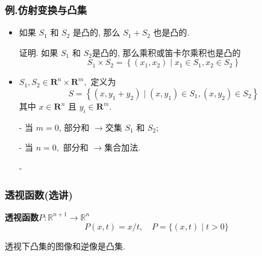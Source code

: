 \documentclass[handout]{beamer}
\begin{document}
\begin{frame}
\frametitle{例.仿射变换与凸集}

\begin{itemize}
	 
\item 
如果 $S_{1}$ 和 $S_{2}$ 是凸的, 那么 $S_{1}+S_{2}$ 也是凸的.


 
\begin{footnotesize}证明. 如果 $S_{1}$ 和 $S_{2}$是凸的, 那么乘积或笛卡尔乘积也是凸的
$$
S_{1} \times S_{2}=\left\{\left(x_{1}, x_{2}\right) \mid x_{1} \in S_{1}, x_{2} \in S_{2}\right\}
$$
\end{footnotesize}

\item  {} $S_{1}, S_{2} \in \mathbf{R}^{n} \times \mathbf{R}^{m},$ 定义为
$$
S=\left\{\left(x, y_{1}+y_{2}\right) \mid\left(x, y_{1}\right) \in S_{1},\left(x, y_{2}\right) \in S_{2}\right\}
$$
其中 $x \in \mathbf{R}^{n}$ 且 $y_{i} \in \mathbf{R}^{m}$.

- 当 $m=0$, 部分和 $\rightarrow$交集 $S_{1}$ 和 $S_{2} ;$

- 当 $n=0,$ 部分和 $\rightarrow$集合加法.

- 
\end{itemize}
\end{frame}

\begin{frame}
	\frametitle{透视函数(选讲)}

	\textbf{透视函数}$P: \mathbb{R}^{n+1} \rightarrow \mathbb{R}^{n}$
    \begin{equation}
	    P(x, t)=x / t, \quad  P=\{(x, t) \mid t>0\}
    \end{equation}
 
透视下凸集的图像和逆像是凸集.


\end{frame}
\end{document}
